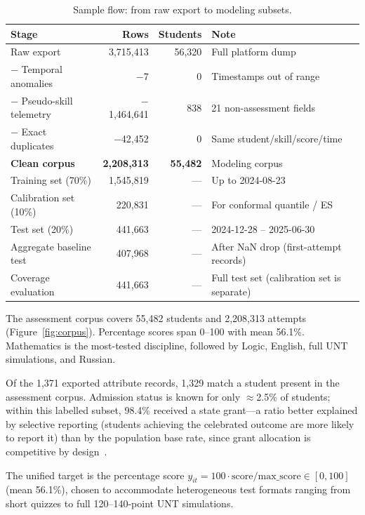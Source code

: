 \documentclass[11pt]{article}
\begin{document}
\begin{table}[ht]
\centering
\caption{Sample flow: from raw export to modeling subsets.}
\label{tab:sampleflow}
\small
\begin{tabular}{lrrl}
\toprule
\textbf{Stage} & \textbf{Rows} & \textbf{Students} & \textbf{Note} \\
\midrule
Raw export & 3{,}715{,}413 & 56{,}320 & Full platform dump \\
$-$ Temporal anomalies & $-$7 & 0 & Timestamps out of range \\
$-$ Pseudo-skill telemetry & $-$1{,}464{,}641 & 838 & 21 non-assessment fields \\
$-$ Exact duplicates & $-$42{,}452 & 0 & Same student/skill/score/time \\
\midrule
\textbf{Clean corpus} & \textbf{2{,}208{,}313} & \textbf{55{,}482} & Modeling corpus \\
\midrule
Training set (70\%) & 1{,}545{,}819 & --- & Up to 2024-08-23 \\
Calibration set (10\%) & 220{,}831 & --- & For conformal quantile / ES \\
Test set (20\%) & 441{,}663 & --- & 2024-12-28 -- 2025-06-30 \\
\addlinespace
\quad Aggregate baseline test & 407{,}968 & --- & After NaN drop (first-attempt records) \\
\quad Coverage evaluation & 441{,}663 & --- & Full test set (calibration set is separate) \\
\bottomrule
\end{tabular}
\end{table}

The assessment corpus covers 55,482 students and 2,208,313 attempts (Figure~\ref{fig:corpus}).
Percentage scores span 0--100 with mean 56.1\%.
Mathematics is the most-tested discipline, followed by Logic, English, full
UNT simulations, and Russian.

Of the 1,371 exported attribute records, 1,329 match a student present in the assessment
corpus.  Admission status is known for only $\approx$2.5\% of students; within this
labelled subset, 98.4\% received a state grant---a ratio better explained by selective
reporting (students achieving the celebrated outcome are more likely to report it) than by
the population base rate, since grant allocation is competitive by design~\cite{didarbekova2025,oecd2017}.

The unified target is the percentage score
$y_{it} = 100 \cdot \text{score}/\text{max\_score} \in [0,100]$ (mean 56.1\%),
chosen to accommodate heterogeneous test formats ranging from short quizzes to full
120--140-point UNT simulations.
\end{document}
